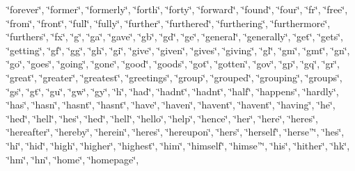 \char`\"{}forever\char`\"{}, \char`\"{}former\char`\"{}, \char`\"{}formerly\char`\"{}, \char`\"{}forth\char`\"{}, \char`\"{}forty\char`\"{}, \char`\"{}forward\char`\"{}, \char`\"{}found\char`\"{}, \char`\"{}four\char`\"{}, \char`\"{}fr\char`\"{}, \char`\"{}free\char`\"{}, \char`\"{}from\char`\"{}, \char`\"{}front\char`\"{}, \char`\"{}full\char`\"{}, \char`\"{}fully\char`\"{}, \char`\"{}further\char`\"{}, \char`\"{}furthered\char`\"{}, \char`\"{}furthering\char`\"{}, \char`\"{}furthermore\char`\"{}, \char`\"{}furthers\char`\"{}, \char`\"{}fx\char`\"{}, \char`\"{}g\char`\"{}, \char`\"{}ga\char`\"{}, \char`\"{}gave\char`\"{}, \char`\"{}gb\char`\"{}, \char`\"{}gd\char`\"{}, \char`\"{}ge\char`\"{}, \char`\"{}general\char`\"{}, \char`\"{}generally\char`\"{}, \char`\"{}get\char`\"{}, \char`\"{}gets\char`\"{}, \char`\"{}getting\char`\"{}, \char`\"{}gf\char`\"{}, \char`\"{}gg\char`\"{}, \char`\"{}gh\char`\"{}, \char`\"{}gi\char`\"{}, \char`\"{}give\char`\"{}, \char`\"{}given\char`\"{}, \char`\"{}gives\char`\"{}, \char`\"{}giving\char`\"{}, \char`\"{}gl\char`\"{}, \char`\"{}gm\char`\"{}, \char`\"{}gmt\char`\"{}, \char`\"{}gn\char`\"{}, \char`\"{}go\char`\"{}, \char`\"{}goes\char`\"{}, \char`\"{}going\char`\"{}, \char`\"{}gone\char`\"{}, \char`\"{}good\char`\"{}, \char`\"{}goods\char`\"{}, \char`\"{}got\char`\"{}, \char`\"{}gotten\char`\"{}, \char`\"{}gov\char`\"{}, \char`\"{}gp\char`\"{}, \char`\"{}gq\char`\"{}, \char`\"{}gr\char`\"{}, \char`\"{}great\char`\"{}, \char`\"{}greater\char`\"{}, \char`\"{}greatest\char`\"{}, \char`\"{}greetings\char`\"{}, \char`\"{}group\char`\"{}, \char`\"{}grouped\char`\"{}, \char`\"{}grouping\char`\"{}, \char`\"{}groups\char`\"{}, \char`\"{}gs\char`\"{}, \char`\"{}gt\char`\"{}, \char`\"{}gu\char`\"{}, \char`\"{}gw\char`\"{}, \char`\"{}gy\char`\"{}, \char`\"{}h\char`\"{}, \char`\"{}had\char`\"{}, \char`\"{}hadn\textquotesingle{}t\char`\"{}, \char`\"{}hadnt\char`\"{}, \char`\"{}half\char`\"{}, \char`\"{}happens\char`\"{}, \char`\"{}hardly\char`\"{}, \char`\"{}has\char`\"{}, \char`\"{}hasn\char`\"{}, \char`\"{}hasn\textquotesingle{}t\char`\"{}, \char`\"{}hasnt\char`\"{}, \char`\"{}have\char`\"{}, \char`\"{}haven\char`\"{}, \char`\"{}haven\textquotesingle{}t\char`\"{}, \char`\"{}havent\char`\"{}, \char`\"{}having\char`\"{}, \char`\"{}he\char`\"{}, \char`\"{}he\textquotesingle{}d\char`\"{}, \char`\"{}he\textquotesingle{}ll\char`\"{}, \char`\"{}he\textquotesingle{}s\char`\"{}, \char`\"{}hed\char`\"{}, \char`\"{}hell\char`\"{}, \char`\"{}hello\char`\"{}, \char`\"{}help\char`\"{}, \char`\"{}hence\char`\"{}, \char`\"{}her\char`\"{}, \char`\"{}here\char`\"{}, \char`\"{}here\textquotesingle{}s\char`\"{}, \char`\"{}hereafter\char`\"{}, \char`\"{}hereby\char`\"{}, \char`\"{}herein\char`\"{}, \char`\"{}heres\char`\"{}, \char`\"{}hereupon\char`\"{}, \char`\"{}hers\char`\"{}, \char`\"{}herself\char`\"{}, \char`\"{}herse”\char`\"{}, \char`\"{}hes\char`\"{}, \char`\"{}hi\char`\"{}, \char`\"{}hid\char`\"{}, \char`\"{}high\char`\"{}, \char`\"{}higher\char`\"{}, \char`\"{}highest\char`\"{}, \char`\"{}him\char`\"{}, \char`\"{}himself\char`\"{}, \char`\"{}himse”\char`\"{}, \char`\"{}his\char`\"{}, \char`\"{}hither\char`\"{}, \char`\"{}hk\char`\"{}, \char`\"{}hm\char`\"{}, \char`\"{}hn\char`\"{}, \char`\"{}home\char`\"{}, \char`\"{}homepage\char`\"{}, 